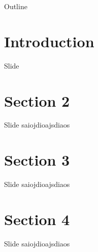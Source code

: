 \begin{frame}
\titlepage
\end{frame}

\begin{frame}{Outline}
\tableofcontents
\end{frame}

\section{Introduction} %
\begin{frame}{Slide}

\begin{tikzpicture}

\end{tikzpicture}

\end{frame}

\section{Section 2} %
\begin{frame}{Slide}
saiojdioajsdiaos
\end{frame}

\section{Section 3} %
\begin{frame}{Slide}
saiojdioajsdiaos
\end{frame}

\section{Section 4} %
\begin{frame}{Slide}
saiojdioajsdiaos
\end{frame}

